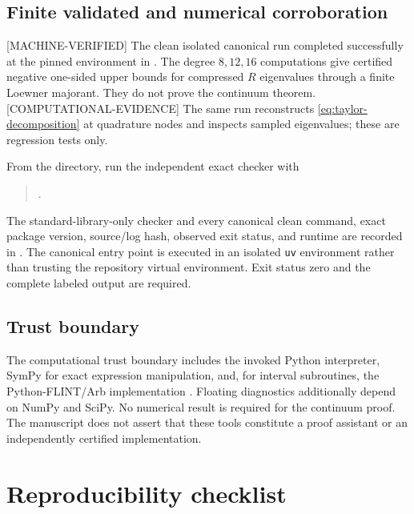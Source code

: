\documentclass[11pt]{article}
\theoremstyle{plain}
\theoremstyle{definition}
\theoremstyle{remark}
\newcommand{\status}[1]{\textnormal{\textsf{\footnotesize[#1]}}}
\newcommand{\MachineVerified}{\status{MACHINE-VERIFIED}}
\newcommand{\ComputationalEvidence}{\status{COMPUTATIONAL-EVIDENCE}}
\begin{document}
\subsection{Finite validated and numerical corroboration}
\label{app:numerical}

\MachineVerified{} The clean isolated canonical run completed successfully at
the pinned environment in .  The degree
\(8,12,16\) computations give certified negative one-sided upper bounds for
compressed \(R\) eigenvalues through a finite Loewner majorant.  They do not
prove the continuum theorem.  \ComputationalEvidence{} The same run
reconstructs \eqref{eq:taylor-decomposition} at quadrature nodes and inspects
sampled eigenvalues; these are regression tests only.

From the  directory, run the independent exact checker with
\begin{quote}\small
{}.
\end{quote}
The standard-library-only checker and every canonical clean command, exact
package version, source/log hash, observed exit status, and runtime are recorded
in .  The canonical entry point is executed in an
isolated \texttt{uv} environment rather than trusting the repository virtual
environment.  Exit status zero and the complete labeled output are required.

\subsection{Trust boundary}
\label{app:trust}

The computational trust boundary includes the invoked Python interpreter,
SymPy for exact expression manipulation, and, for interval subroutines, the
Python-FLINT/Arb implementation \cite{arb}.  Floating diagnostics additionally depend on
NumPy and SciPy.  No numerical result is required for the continuum proof.
The manuscript does not assert that these tools constitute a proof assistant
or an independently certified implementation.

\section{Reproducibility checklist}
\label{app:reproducibility}
\end{document}
